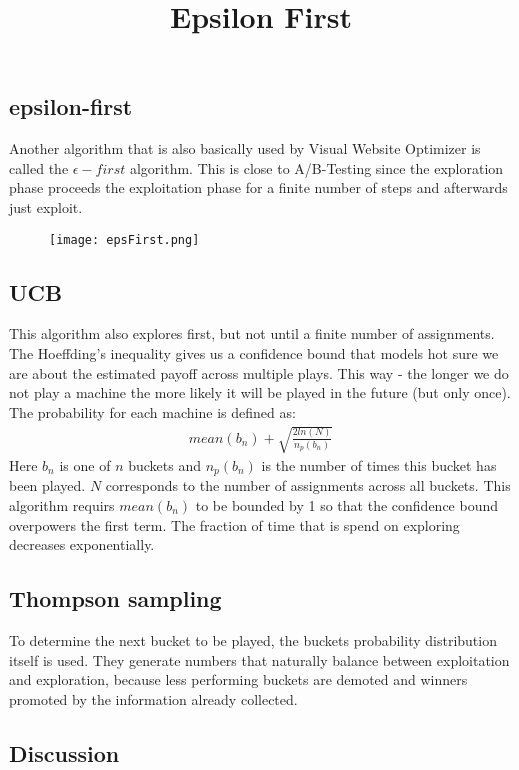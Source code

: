 \documentclass[main.tex]{subfiles}
\begin{document}
\subsection{epsilon-first}
Another algorithm that is also basically used by Visual Website Optimizer is called the $\epsilon-first$ algorithm. This is close to A/B-Testing since the exploration phase proceeds the exploitation phase for a finite number of steps and afterwards just exploit.
\begin{figure}[ht]
\texttt{[image: epsFirst.png]}
\centering
\title{Epsilon First}
\end{figure}
\subsection{UCB}
This algorithm also explores first, but not until a finite number of assignments. The Hoeffding's inequality gives us a confidence bound that models hot sure we are about the estimated payoff across multiple plays. This way - the longer we do not play a machine the more likely it will be played in the future (but only once). The probability for each machine is defined as:
\begin{align*}
mean(b_n) + \sqrt{\frac{2ln(N)}{n_p(b_n)}}
\end{align*}
Here $b_n$ is one of $n$ buckets and $n_p(b_n)$ is the number of times this bucket has been played. $N$ corresponds to the number of assignments across all buckets. This algorithm requirs $mean(b_n)$ to be bounded by 1 so that the confidence bound overpowers the first term. The fraction of time that is spend on exploring decreases exponentially.
\subsection{Thompson sampling}
To determine the next bucket to be played, the buckets probability distribution itself is used. They generate numbers that naturally balance between exploitation and exploration, because less performing buckets are demoted and winners promoted by the information already collected.
\subsection{Discussion}
\end{document}
